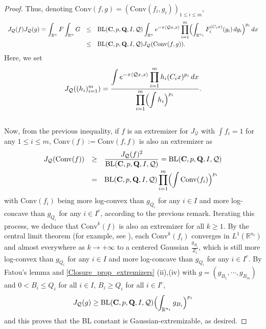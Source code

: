 \documentclass[11pt,a4paper,reqno]{amsart}
\numberwithin{equation}{section}
\theoremstyle{definition}
\newcommand{\nm}{\noalign{\smallskip}}
\newcommand{\ds}{\displaystyle}
\newcommand{\<}{\ensuremath \leq}
\renewcommand{\>}{\ensuremath \geq}
\begin{document}
\begin{proof}
Thus, denoting $\mathrm{Conv}(f,g)=(\mathrm{Conv}(f_i,g_i))_{1 \leq i \leq m}$, \begin{equation} \label{J_Q_increases_under_CONV} \begin{array}{lll}
\ds J_{\mathcal Q}(f)J_{\mathcal Q}(g)=\int_{\mathbb{R}^n}F \int_{\mathbb{R}^n}G &\leq& \ds \mathrm{BL}(\textbf{C},p,\textbf{Q},I,\mathcal Q)\int_{\mathbb{R}^n}e^{-\pi \langle \mathcal Qx,x \rangle} \prod_{i=1}^m \Bigl ( \int_{\mathbb{R}^{n_i}}F_i^{(C_ix)}(y_i)\, dy_i\Bigl)^{p_i} \, dx \\
\nm 
&\leq& \mathrm{BL}(\textbf{C},p,\textbf{Q},I,\mathcal Q) J_{\mathcal Q}(\mathrm{Conv}(f,g)).
\end{array} \end{equation} Here, we set $$J_{\mathcal Q}((h_i)_{i=1}^m)=\frac{\ds \int e^{-\pi \langle \mathcal Qx,x\rangle}\prod_{i=1}^m h_i(C_ix)^{p_i}\, dx}{\ds \prod_{i=1}^m \Bigl( \int h_i \Bigl)^{p_i}}.$$ \hfill \\ %
Now, from the previous inequality, if $f$ is an extremizer for $J_{\mathcal Q}$ with $\int f_i=1$ for any $1 \leq i \leq m$, $\mathrm{Conv}(f):=\mathrm{Conv}(f,f)$ is also an extremizer as $$\begin{array}{lll}J_{\mathcal Q}(\mathrm{Conv}(f)) &\geq& \ds \frac{J_{\mathcal Q}(f)^2}{\mathrm{BL}(\textbf{C},p,\textbf{Q},I,\mathcal Q)}=\mathrm{BL}(\textbf{C},p,\textbf{Q},I,\mathcal Q)\\
\nm 
&=& \ds \mathrm{BL}(\textbf{C},p,\textbf{Q},I,\mathcal Q)\prod_{i=1}^m \Bigl( \int \mathrm{Conv}(f_i) \Bigl)^{p_i}\end{array}$$ with $\mathrm{Conv}(f_i)$ being more log-convex than $g_{Q_i}$ for any $i \in I$ and more log-concave than $g_{Q_i}$ for any $i \in I^c$, according to the previous remark. Iterating this process, we deduce that $\mathrm{Conv}^k(f)$ is also an extremizer for all $k \geq 1.$ By the central limit theorem (for example, see \cite[Thm 1.1]{Bobkov}), each $\mathrm{Conv}^k(f_i)$ converges in $L^1(\mathbb{R}^{n_i})$ and almost everywhere as $k \rightarrow +\infty$ to a centered Gaussian $\frac{g_{B_i}}{Z_i}$, which is still more log-convex than $g_{Q_i}$ for any $i \in I$ and more log-concave than $g_{Q_i}$ for any $i \in I^c.$
By Fatou's lemma and \cref{Closure_prop_extremizers} (ii),(iv) with $g=(g_{B_1},\cdots,g_{B_m})$ and $0<B_i \leq Q_i$ for all $i \in I$, $B_i \ge Q_i$ for all $i \in I^c$, $$J_{\mathcal Q}(g) \geq \mathrm{BL}(\textbf{C},p,\textbf{Q},I,\mathcal Q) \Bigl(\int_{\mathbb{R}^{n_i}}g_{B_i} \Bigl)^{p_i}$$ and this proves that the BL constant is Gaussian-extremizable, as desired. 
\end{proof}
\end{document}
